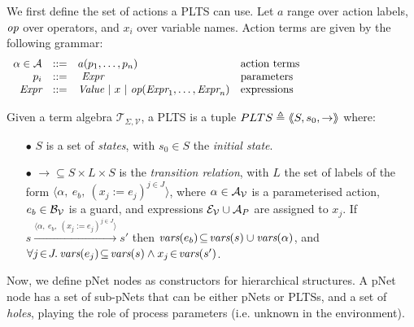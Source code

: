 \documentclass[smallcondensed]{svjour3}
\newcommand{\noteSB}[2][color=green!40, size=\tiny]{\todo[#1]{{\bf Simon: } {#2}}}
\newcommand{\cT}{\ensuremath{\mathcal{T}}}
\newcommand{\cV}{\ensuremath{\mathcal{V}}}
\newcommand{\signature}{\ensuremath{\Sigma}}
\newcommand{\variables}{\ensuremath{\cV}}
\newcommand{\Talg}{\ensuremath{\cT_{\signature,\variables}}}
\def\AlgE{\mathcal{E}}
\def\AlgA{\mathcal{A}}
\def\AlgB{\mathcal{B}}
\begin{document}
We first define the set of actions a PLTS can use.  Let $a$
range over action labels, $\symb{op}$ over operators, and $x_i$  over
variable names. Action terms are given by the following grammar:
\[
\begin{array}[l]{rcl@{\quad}p{5.5cm}}
\alpha\in\AlgA&::=&a(p_1,\ldots,p_n)&\text{action terms}\\
p_i&::=& ~\symb{Expr}&\text{parameters}\\
\symb{Expr}&::=& \symb{Value}~|~x~|~\symb{op}(\symb{Expr}_1,\dots,\symb{Expr}_n)&\text{expressions}
\end{array}
\]

\begin{definition}[PLTS]
	\label{PLTS}
	Given a term algebra $\Talg$, a PLTS is a tuple
	$PLTS\triangleq\langle\hspace{-0.58ex}\langle S,s_0, \to\rangle\hspace{-0.58ex}\rangle$ where:
	\begin{itemize}
		\item[$\bullet$]
		$S$ is a set of \emph{states}, with $s_0 \in S$ the \emph{initial state}.
		\item[$\bullet$] $\to \subseteq S \times L \times S$ is the \emph{transition relation}, with
		$L$ the set of labels of the form
		$\langle \alpha,~e_b,~(x_j\!:= {e}_j)^{j\in J}\rangle$,
		where $\alpha \in\AlgA_{\P}$ is a parameterised action,
		$e_b \in \AlgB_{\P}$ is a guard, and
		expressions  $\AlgE_{\P}\cup\AlgA_{P}$ are assigned to $x_j$.
		If 
		$s \xrightarrow{\langle \alpha,~e_b,~(x_j\!:= {e}_j)^{j\in
				J}\rangle} s'$ then 
		$\vars(e_b)\!\subseteq\! \vars(s)\cup\vars(\alpha)$, and
		$\forall j\!\in\! J .\,\vars(e_j)\!\subseteq\! \vars(s)\land 
		x_j\!\in\!\vars(s')$.
	\end{itemize}
\end{definition}

Now, we define
pNet nodes as constructors for hierarchical structures.
A pNet node has a set of sub-pNets that can be either pNets or PLTSs, and a
set of \emph{holes}, playing the role of process parameters
(i.e. unknown in the environment).
\end{document}
